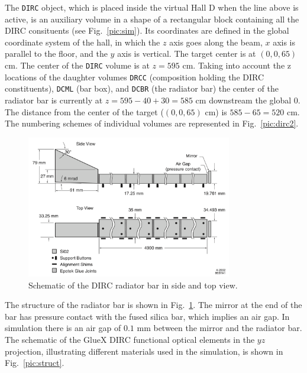 \documentclass[11pt, a4paper]{article}
\begin{document}
The \texttt{DIRC} object, which is placed inside the virtual Hall D when the line above is active, is an auxiliary volume in a shape of a rectangular block containing all the DIRC consituents (see Fig.~\ref{pic:sim}). Its coordinates are defined in the global coordinate system of the hall, in which the $z$ axis goes along the beam, $x$ axis is parallel to the floor, and the $y$ axis is vertical. The target center is at $(0, 0, 65)$ cm. The center of the \texttt{DIRC} volume is at $z = 595$ cm.
Taking into account the z locations of the daughter volumes \texttt{DRCC} (composition holding the DIRC constituents), \texttt{DCML} (bar box), and \texttt{DCBR} (the radiator bar) the center of the radiator bar is currently at $z = 595 - 40 + 30 =585$ cm downstream the global 0. The distance from the center of the target ($(0, 0, 65)$ cm) is $585 - 65 = 520$ cm. The numbering schemes of individual volumes are represented in Fig.~\ref{pic:dirc2}.

\begin{figure}[!htb]
\centering
\includegraphics[width=0.8\textwidth]{pics/bars.png}
\caption{\label{pic:bar}
Schematic of the DIRC radiator bar in side and top view.
}
\end{figure} 

The structure of the radiator bar is shown in Fig.~\ref{pic:bar}. The mirror at the end of the bar has pressure contact with the fused silica bar, which implies an air gap. In simulation there is an air gap of $0.1$ mm between the mirror and the radiator bar. The schematic of the GlueX DIRC functional optical elements in the $yz$ projection, illustrating different materials used in the simulation, is shown in Fig.~\ref{pic:struct}.
\end{document}

